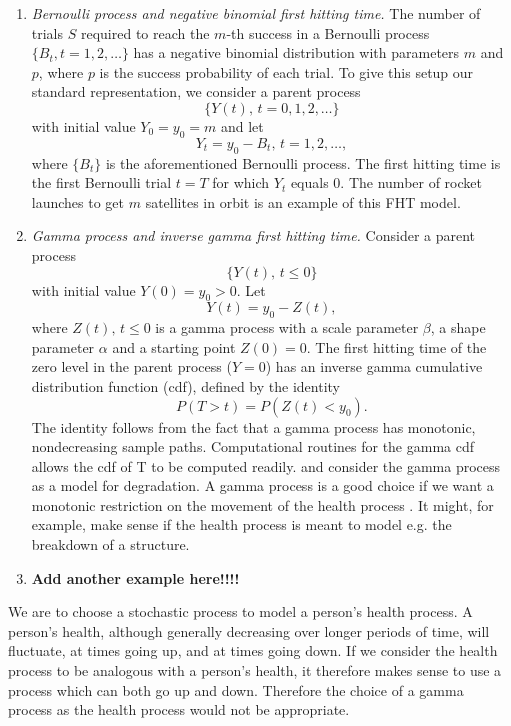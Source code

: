 \begin{enumerate}
    \item \textit{Bernoulli process and negative binomial first hitting time.} The number of trials $S$ required to reach the $m$-th success in a Bernoulli process $\{B_t,t=1,2,\ldots\}$ has a negative binomial distribution with parameters $m$ and $p$, where $p$ is the success probability of each trial. To give this setup our standard representation, we consider a parent process
    \begin{equation*}
        \{Y(t),\,t=0,1,2,\ldots\}
    \end{equation*}
    with initial value $Y_0=y_0=m$ and let
    \begin{equation*}
        Y_t=y_0-B_t,\,t=1,2,\ldots,
    \end{equation*}
    where $\{B_t\}$ is the aforementioned Bernoulli process. The first hitting time is the first Bernoulli trial $t=T$ for which $Y_t$ equals 0. The number of rocket launches to get $m$ satellites in orbit is an example of this FHT model.
    \item \textit{Gamma process and inverse gamma first hitting time.} Consider a parent process
    \begin{equation*}
        \{Y(t),\,t\leq0\}
    \end{equation*}
    with initial value $Y(0)=y_0>0$. Let
    \begin{equation*}
        Y(t)=y_0-Z(t),
    \end{equation*}
    where $Z(t),\,t\leq0$ is a gamma process with a scale parameter $\beta$, a shape parameter $\alpha$ and a starting point $Z(0)=0$. The first hitting time of the zero level in the parent process ($Y=0$) has an inverse gamma cumulative distribution function (cdf), defined by the identity
    \begin{equation}
        P(T>t)=P(Z(t)<y_0).
    \end{equation}
    The identity follows from the fact that a gamma process has monotonic, nondecreasing sample paths.
    Computational routines for the gamma cdf allows the cdf of T to be computed readily.
    \citet{singpurwalla1995} and \citet{lawless2004} consider the gamma process as a model for degradation.
    A gamma process is a good choice if we want a monotonic restriction on the movement of the health process \citep{leewhitmore2006}. 
    It might, for example, make sense if the health process is meant to model e.g. the breakdown of a structure.
    \item \textbf{Add another example here!!!!}
\end{enumerate}
We are to choose a stochastic process to model a person's health process.
A person's health, although generally decreasing over longer periods of time, will fluctuate, at times going up, and at times going down.
If we consider the health process to be analogous with a person's health, it therefore makes sense to use a process which can both go up and down.
Therefore the choice of a gamma process as the health process would not be appropriate.

